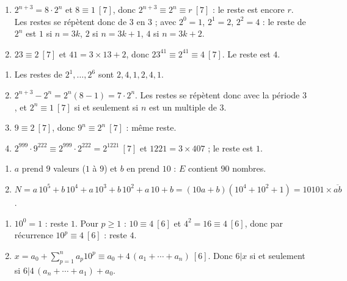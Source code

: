 \begin{corrige}
%
\begin{sol}
\begin{enumerate}
\item $2^{n+3} = 8 \cdot 2^n$ et $8 \equiv 1 \ [7]$, donc $2^{n+3} \equiv 2^n \equiv r \ [7]$ : le reste est encore $r$.
      Les restes se r\'ep\`etent donc de $3$ en $3$ ; avec $2^0 = 1$, $2^1 = 2$, $2^2 = 4$ :
      le reste de $2^n$ est $1$ si $n = 3k$, $2$ si $n = 3k+1$, $4$ si $n = 3k+2$.
\item $23 \equiv 2 \ [7]$ et $41 = 3 \times 13 + 2$, donc $23^{41} \equiv 2^{41} \equiv 4 \ [7]$. Le reste est $4$.
\end{enumerate}
\end{sol}
%
\begin{sol}
\begin{enumerate}
\item Les restes de $2^1, \ldots, 2^6$ sont $2, 4, 1, 2, 4, 1$.
\item $2^{n+3} - 2^n = 2^n (8 - 1) = 7 \cdot 2^n$. Les restes se r\'ep\`etent donc avec la p\'eriode $3$, et $2^n \equiv 1 \ [7]$
      si et seulement si $n$ est un multiple de $3$.
\item $9 \equiv 2 \ [7]$, donc $9^n \equiv 2^n \ [7]$ : m\^eme reste.
\item $2^{999} \cdot 9^{222} \equiv 2^{999} \cdot 2^{222} = 2^{1221} \ [7]$ et $1221 = 3 \times 407$ ; le reste est $1$.
\end{enumerate}
\end{sol}
%
\begin{sol}
\begin{enumerate}
\item $a$ prend $9$ valeurs ($1$ \`a $9$) et $b$ en prend $10$ : $E$ contient $90$ nombres.
\item $N = a\,10^5 + b\,10^4 + a\,10^3 + b\,10^2 + a\,10 + b = (10a + b)(10^4 + 10^2 + 1) = 10101 \times \overline{ab}$.
\end{enumerate}
\end{sol}
%
\begin{sol}
\begin{enumerate}
\item $10^0 = 1$ : reste $1$. Pour $p \geq 1$ : $10 \equiv 4 \ [6]$ et $4^2 = 16 \equiv 4 \ [6]$, donc par r\'ecurrence $10^p \equiv 4 \ [6]$ : reste $4$.
\item $x = a_0 + \sum_{p=1}^n a_p 10^p \equiv a_0 + 4\,(a_1 + \cdots + a_n) \ [6]$.
      Donc $6 | x$ si et seulement si $6 | 4\,(a_n + \cdots + a_1) + a_0$.

\end{enumerate}
\end{sol}
\end{corrige}
